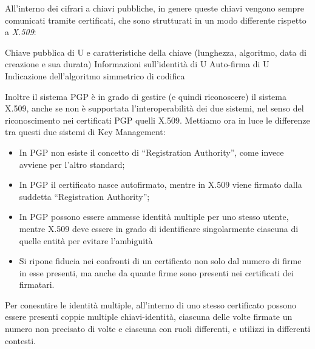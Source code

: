 All'interno dei cifrari a chiavi pubbliche, in genere queste chiavi vengono sempre
comunicati tramite certificati, che sono strutturati in un modo differente rispetto
a \textit{X.509}:
\begin{itemize}
\diam Chiave pubblica di U e caratteristiche della chiave (lunghezza, algoritmo,
	data di creazione e sua durata)
\diam Informazioni sull'identità di U
\diam Auto-firma di U
\diam Indicazione dell'algoritmo simmetrico di codifica
\end{itemize}
Inoltre il sistema PGP è in grado di gestire (e quindi riconoscere) il sistema
X.509, anche se non è supportata l'interoperabilità dei due sistemi, nel senso
del riconoscimento nei certificati PGP quelli X.509.
Mettiamo ora in luce le differenze tra questi due sistemi di Key Management:
\begin{itemize}
\item In PGP non esiste il concetto di ``Registration Authority'', come invece
	avviene per l'altro standard;
\item In PGP il certificato nasce  autofirmato, mentre in X.509 viene firmato
	dalla suddetta ``Registration Authority'';
\item In PGP possono essere ammesse identità multiple per uno stesso utente, 
	mentre X.509 deve essere in grado di identificare singolarmente ciascuna
	di quelle entità per evitare l'ambiguità
\item Si ripone fiducia nei confronti di un certificato non solo dal numero di
	firme in esse presenti, ma anche da quante firme sono presenti nei
	certificati dei firmatari.
\end{itemize}
Per conesntire le identità multiple, all'interno di uno stesso certificato
possono essere presenti coppie multiple chiavi-identità, ciascuna delle volte
firmate un numero non precisato di volte e ciascuna con ruoli differenti, e
utilizzi in differenti contesti.



